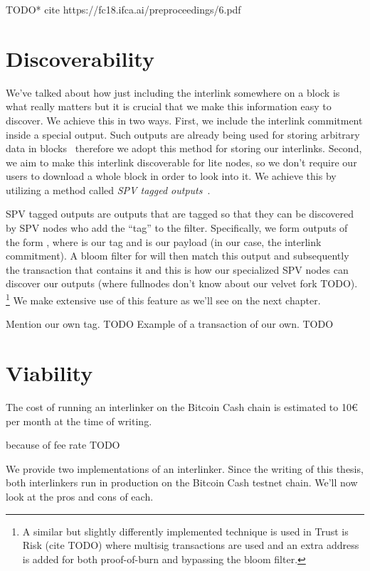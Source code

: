 TODO* cite https://fc18.ifca.ai/preproceedings/6.pdf

\section{Discoverability}
We've talked about how just including the interlink somewhere on a block is what really matters but it is crucial that we make this information easy to discover. We achieve this in two ways. First, we include the interlink commitment inside a special  output. Such outputs are already being used for storing arbitrary data in blocks~\cite{arbitrary-data} therefore we adopt this method for storing our interlinks. Second, we aim to make this interlink discoverable for lite nodes, so we don't require our users to download a whole block in order to look into it. We achieve this by utilizing a method called \emph{SPV tagged outputs}~\cite{spv-tagged}.

SPV tagged outputs are outputs that are tagged so that they can be discovered by SPV nodes who add the ``tag'' to the filter. Specifically, we form outputs of the form , where  is our tag and  is our payload (in our case, the interlink commitment). A bloom filter for  will then match this output and subsequently the transaction that contains it and this is how our specialized SPV nodes can discover our outputs (where fullnodes don't know about our velvet fork TODO).
\footnote{A similar but slightly differently implemented technique is used in Trust is Risk (cite TODO) where multisig transactions are used and an extra address is added for both proof-of-burn and bypassing the bloom filter.}
We make extensive use of this feature as we'll see on the next chapter.

Mention our own tag. TODO
Example of a transaction of our own. TODO

\section{Viability}
The cost of running an interlinker on the Bitcoin Cash chain is estimated to 10€ per month at the time of writing.

because of fee rate TODO

We provide two implementations of an interlinker. Since the writing of this thesis, both interlinkers run in production on the Bitcoin Cash testnet chain. We'll now look at the pros and cons of each.

